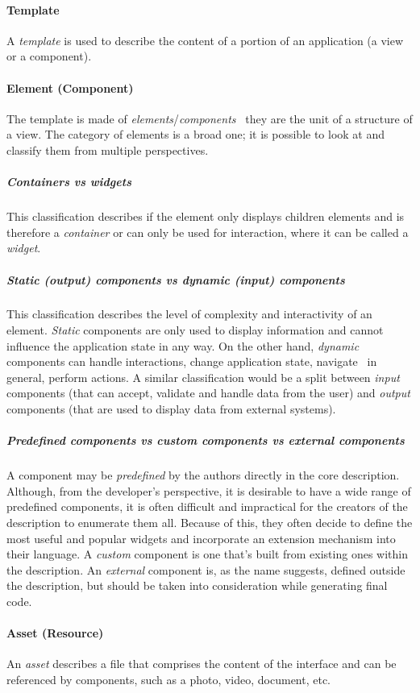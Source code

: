 \paragraph{Template}
A \emph{template} is used to describe the content of a portion of an application (a view or a component).

\paragraph{Element (Component)}
The template is made of \emph{elements}/\emph{components} \textendash\ they are the unit of a structure of a view.
The category of elements is a broad one;
it is possible to look at and classify them from multiple perspectives.

\subparagraph{Containers vs widgets}
This classification describes if the element only displays children elements and is therefore a \emph{container} or can only be used for interaction, where it can be called a \emph{widget}.

\subparagraph{Static (output) components vs dynamic (input) components}
This classification describes the level of complexity and interactivity of an element.
\emph{Static} components are only used to display information and cannot influence the application state in any way.
On the other hand, \emph{dynamic} components can handle interactions, change application state, navigate \textendash\ in general, perform actions.
A similar classification would be a split between \emph{input} components (that can accept, validate and handle data from the user) and \emph{output} components (that are used to display data from external systems).

\subparagraph{Predefined components vs custom components vs external components}
A component may be \emph{predefined} by the authors directly in the core description.
Although, from the developer's perspective, it is desirable to have a wide range of predefined components, it is often difficult and impractical for the creators of the description to enumerate them all.
Because of this, they often decide to define the most useful and popular widgets and incorporate an extension mechanism into their language.
A \emph{custom} component is one that's built from existing ones within the description.
An \emph{external} component is, as the name suggests, defined outside the description, but should be taken into consideration while generating final code.

\paragraph{Asset (Resource)}
An \emph{asset} describes a file that comprises the content of the interface and can be referenced by components, such as a photo, video, document, etc.


